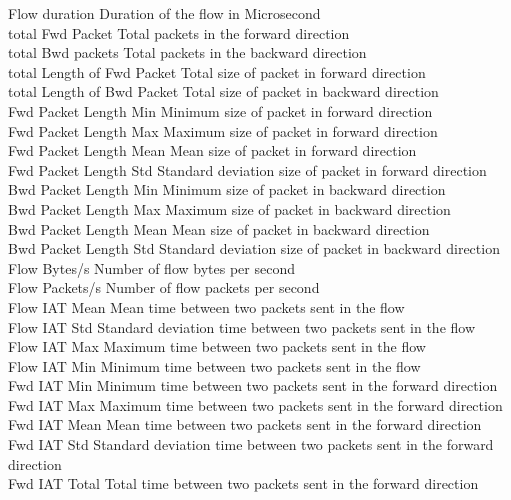 Flow duration			Duration of the flow in Microsecond \\
total Fwd Packet		Total packets in the forward direction \\
total Bwd packets		Total packets in the backward direction \\
total Length of Fwd Packet	Total size of packet in forward direction \\
total Length of Bwd Packet	Total size of packet in backward direction \\
Fwd Packet Length Min 		Minimum size of packet in forward direction \\
Fwd Packet Length Max 		Maximum size of packet in forward direction \\
Fwd Packet Length Mean		Mean size of packet in forward direction \\
Fwd Packet Length Std		Standard deviation size of packet in forward direction \\
Bwd Packet Length Min		Minimum size of packet in backward direction \\
Bwd Packet Length Max		Maximum size of packet in backward direction \\
Bwd Packet Length Mean		Mean size of packet in backward direction \\
Bwd Packet Length Std		Standard deviation size of packet in backward direction \\
Flow Bytes/s			Number of flow bytes per second \\
Flow Packets/s			Number of flow packets per second  \\
Flow IAT Mean			Mean time between two packets sent in the flow \\
Flow IAT Std			Standard deviation time between two packets sent in the flow \\
Flow IAT Max			Maximum time between two packets sent in the flow \\
Flow IAT Min			Minimum time between two packets sent in the flow \\
Fwd IAT Min			Minimum time between two packets sent in the forward direction \\
Fwd IAT Max			Maximum time between two packets sent in the forward direction \\
Fwd IAT Mean			Mean time between two packets sent in the forward direction \\
Fwd IAT Std			Standard deviation time between two packets sent in the forward direction \\
Fwd IAT Total   		Total time between two packets sent in the forward direction \\
